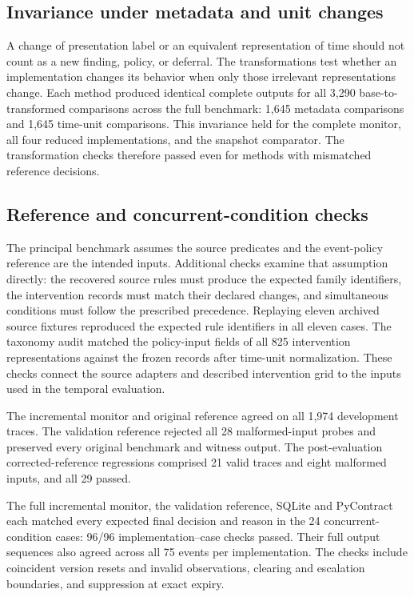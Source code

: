 \documentclass[preprint,11pt]{elsarticle}
\begin{document}
\subsection{Invariance under metadata and unit changes}
A change of presentation label or an equivalent representation of time should not count as a new finding, policy, or deferral. The transformations test whether an implementation changes its behavior when only those irrelevant representations change. Each method produced identical complete outputs for all 3,290 base-to-transformed comparisons across the full benchmark: 1,645 metadata comparisons and 1,645 time-unit comparisons. This invariance held for the complete monitor, all four reduced implementations, and the snapshot comparator. The transformation checks therefore passed even for methods with mismatched reference decisions.

\subsection{Reference and concurrent-condition checks}
The principal benchmark assumes the source predicates and the event-policy reference are the intended inputs. Additional checks examine that assumption directly: the recovered source rules must produce the expected family identifiers, the intervention records must match their declared changes, and simultaneous conditions must follow the prescribed precedence. Replaying eleven archived source fixtures reproduced the expected rule identifiers in all eleven cases. The taxonomy audit matched the policy-input fields of all 825 intervention representations against the frozen records after time-unit normalization. These checks connect the source adapters and described intervention grid to the inputs used in the temporal evaluation.

The incremental monitor and original reference agreed on all 1,974 development traces. The validation reference rejected all 28 malformed-input probes and preserved every original benchmark and witness output. The post-evaluation corrected-reference regressions comprised 21 valid traces and eight malformed inputs, and all 29 passed.

The full incremental monitor, the validation reference, SQLite and PyContract each matched every expected final decision and reason in the 24 concurrent-condition cases: 96/96 implementation--case checks passed. Their full output sequences also agreed across all 75 events per implementation. The checks include coincident version resets and invalid observations, clearing and escalation boundaries, and suppression at exact expiry.
\end{document}
